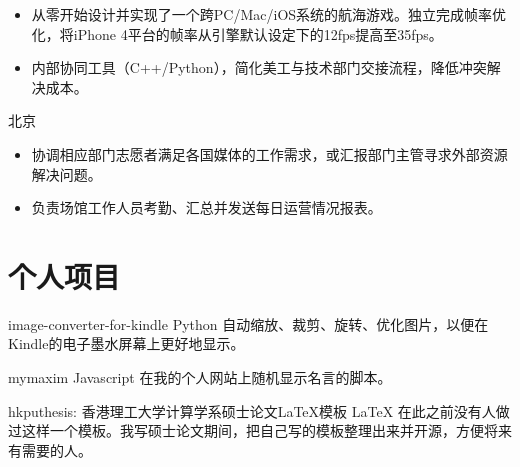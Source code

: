 \documentclass[11pt,a4paper]{moderncv/moderncv}
\begin{document}
{
\begin{itemize}
	\item 从零开始设计并实现了一个跨PC/Mac/iOS系统的航海游戏。独立完成帧率优化，将iPhone 4平台的帧率从引擎默认设定下的12fps提高至35fps。
	\item 内部协同工具（C++/Python），简化美工与技术部门交接流程，降低冲突解决成本。
\end{itemize}
}


{北京}{}
{
\begin{itemize}
	\item 协调相应部门志愿者满足各国媒体的工作需求，或汇报部门主管寻求外部资源解决问题。
	\item 负责场馆工作人员考勤、汇总并发送每日运营情况报表。
\end{itemize}
}


\section{个人项目}
{image-converter-for-kindle}
{Python}
{}{}
{
自动缩放、裁剪、旋转、优化图片，以便在Kindle的电子墨水屏幕上更好地显示。
}

{mymaxim}
{Javascript}
{}{}
{
在我的个人网站上随机显示名言的脚本。
}

{hkputhesis: 香港理工大学计算学系硕士论文\LaTeX 模板}
{\LaTeX}
{}{}
{
在此之前没有人做过这样一个模板。我写硕士论文期间，把自己写的模板整理出来并开源，方便将来有需要的人。
}
\end{document}
